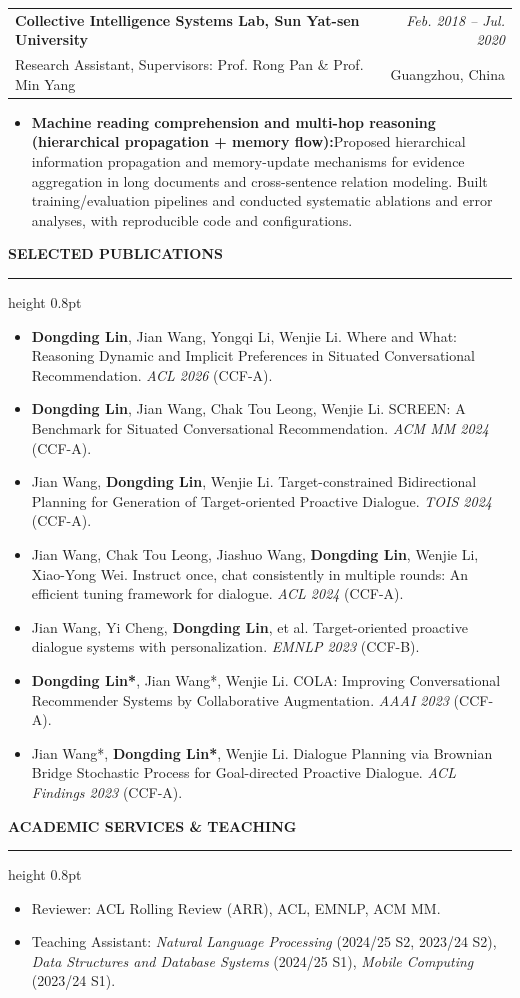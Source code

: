 \documentclass[11pt,a4paper]{article}
\makeatletter
\newcommand{\Section}[1]{%
    \vspace{0.50em}
    {\color{Accent}\bfseries\large #1}\par
    \vspace{0.26em}
    {\color{RuleGray}\hrule height 0.8pt}
    \vspace{0.42em}
}
\newcommand{\Entry}[5][0.16em]{%
\begin{tabularx}{\linewidth}{@{}Xr@{}}
\textbf{#2} & \textit{#3}\\
{\small #4} & {\small #5}
\end{tabularx}\vspace{#1}
}
\makeatother
\begin{document}
\Entry{Collective Intelligence Systems Lab, Sun Yat-sen University}{Feb. 2018 -- Jul. 2020}{Research Assistant, Supervisors: Prof. Rong Pan \& Prof. Min Yang}{Guangzhou, China}
\begin{itemize}
    \item \textbf{Machine reading comprehension and multi-hop reasoning (hierarchical propagation + memory flow):}Proposed hierarchical information propagation and memory-update mechanisms for evidence aggregation in long documents and cross-sentence relation modeling. Built training/evaluation pipelines and conducted systematic ablations and error analyses, with reproducible code and configurations.
\end{itemize}

\Section{SELECTED PUBLICATIONS}
\begin{itemize}
    \item \textbf{Dongding Lin}, Jian Wang, Yongqi Li, Wenjie Li. Where and What: Reasoning Dynamic and Implicit Preferences in Situated Conversational Recommendation. \textit{ACL 2026} (CCF-A).
    \item \textbf{Dongding Lin}, Jian Wang, Chak Tou Leong, Wenjie Li. SCREEN: A Benchmark for Situated Conversational Recommendation. \textit{ACM MM 2024} (CCF-A).
    \item Jian Wang, \textbf{Dongding Lin}, Wenjie Li. Target-constrained Bidirectional Planning for Generation of Target-oriented Proactive Dialogue. \textit{TOIS 2024} (CCF-A).
    \item Jian Wang, Chak Tou Leong, Jiashuo Wang, \textbf{Dongding Lin}, Wenjie Li, Xiao-Yong Wei. Instruct once, chat consistently in multiple rounds: An efficient tuning framework for dialogue. \textit{ACL 2024} (CCF-A).
    \item Jian Wang, Yi Cheng, \textbf{Dongding Lin}, et al. Target-oriented proactive dialogue systems with personalization. \textit{EMNLP 2023} (CCF-B).
    \item \textbf{Dongding Lin*}, Jian Wang*, Wenjie Li. COLA: Improving Conversational Recommender Systems by Collaborative Augmentation. \textit{AAAI 2023} (CCF-A).
    \item Jian Wang*, \textbf{Dongding Lin*}, Wenjie Li. Dialogue Planning via Brownian Bridge Stochastic Process for Goal-directed Proactive Dialogue. \textit{ACL Findings 2023} (CCF-A).
\end{itemize}

\Section{ACADEMIC SERVICES \& TEACHING}
\begin{itemize}
    \item Reviewer: ACL Rolling Review (ARR), ACL, EMNLP, ACM MM.
    \item Teaching Assistant: \textit{Natural Language Processing} (2024/25 S2, 2023/24 S2), \textit{Data Structures and Database Systems} (2024/25 S1), \textit{Mobile Computing} (2023/24 S1).
\end{itemize}
\end{document}
